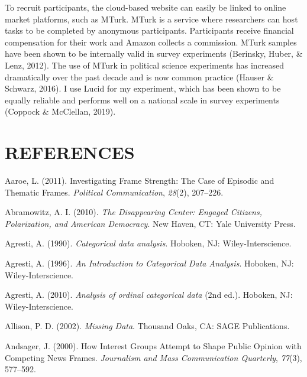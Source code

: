 \documentclass[12pt,econ]{sources/authesis}
\begin{document}
To recruit participants, the cloud-based website can easily be linked to online market platforms, such as MTurk. MTurk is a service where researchers can host tasks to be completed by anonymous participants. Participants receive financial compensation for their work and Amazon collects a commission. MTurk samples have been shown to be internally valid in survey experiments (Berinsky, Huber, \& Lenz, 2012). The use of MTurk in political science experiments has increased dramatically over the past decade and is now common practice (Hauser \& Schwarz, 2016). I use Lucid for my experiment, which has been shown to be equally reliable and performs well on a national scale in survey experiments (Coppock \& McClellan, 2019).

\hypertarget{references}{%
\chapter*{REFERENCES}\label{references}}

\noindent

\ssp

\hypertarget{refs}{}
\leavevmode\hypertarget{ref-aaroe_investigating_2011}{}%
Aaroe, L. (2011). Investigating Frame Strength: The Case of Episodic and Thematic Frames. \emph{Political Communication}, \emph{28}(2), 207--226.

\leavevmode\hypertarget{ref-abramowitz_disappearing_2010}{}%
Abramowitz, A. I. (2010). \emph{The Disappearing Center: Engaged Citizens, Polarization, and American Democracy}. New Haven, CT: Yale University Press.

\leavevmode\hypertarget{ref-agresti_1990_categorical}{}%
Agresti, A. (1990). \emph{Categorical data analysis}. Hoboken, NJ: Wiley-Interscience.

\leavevmode\hypertarget{ref-agresti_1996_introduction}{}%
Agresti, A. (1996). \emph{An Introduction to Categorical Data Analysis}. Hoboken, NJ: Wiley-Interscience.

\leavevmode\hypertarget{ref-agresti_2010_analysis}{}%
Agresti, A. (2010). \emph{Analysis of ordinal categorical data} (2nd ed.). Hoboken, NJ: Wiley-Interscience.

\leavevmode\hypertarget{ref-allison_2002_missing}{}%
Allison, P. D. (2002). \emph{Missing Data}. Thousand Oaks, CA: SAGE Publications.

\leavevmode\hypertarget{ref-andsager_how_2000}{}%
Andsager, J. (2000). How Interest Groups Attempt to Shape Public Opinion with Competing News Frames. \emph{Journalism and Mass Communication Quarterly}, \emph{77}(3), 577--592.
\end{document}
